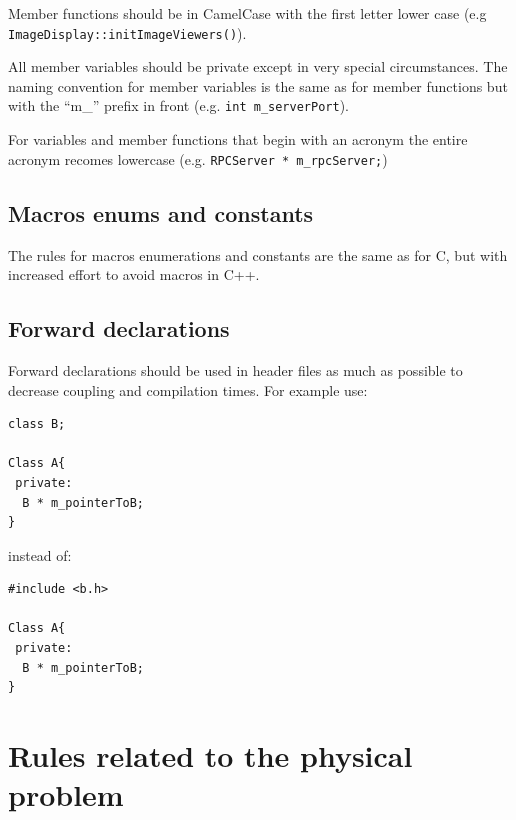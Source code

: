 \documentclass[12pt]{article}
\newenvironment{sourcestyle}{}{}%
\begin{document}
Member functions should be in CamelCase with the first letter lower case (e.g {\tt ImageDisplay::initImageViewers()}).

All member variables should be private except in very special circumstances. 
The naming convention for member variables is the same as for member functions but with the ``m\_'' prefix in front (e.g. {\tt int m\_serverPort}).

For variables and member functions that begin with an acronym the entire acronym recomes lowercase (e.g. {\tt RPCServer * m\_rpcServer;})
\subsection{Macros enums and constants}
The rules for macros enumerations and constants are the same as for C, but with increased effort to avoid macros in C++.

\subsection{Forward declarations}
Forward declarations should be used in header files as much as possible to decrease coupling and compilation times.
For example use:
\begin{sourcestyle}
\begin{verbatim}
class B;

Class A{
 private:
  B * m_pointerToB;
}
\end{verbatim}
\end{sourcestyle}
instead of:
\begin{sourcestyle}
\begin{verbatim}
#include <b.h>

Class A{
 private:
  B * m_pointerToB;
}
\end{verbatim}
\end{sourcestyle}

\section{Rules related to the physical problem}
\end{document}
